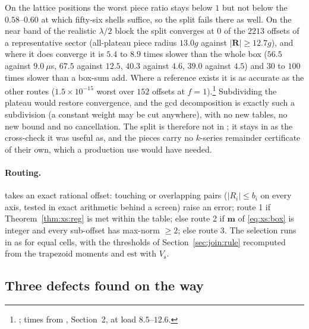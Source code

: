 \noindent
On the lattice positions the worst piece ratio stays below $1$ but not below the
$0.58$--$0.60$ at which fifty-six shells suffice, so the split fails there as well. On the
near band of the realistic $\lambda/2$ block the split converges at $0$ of the
$2213$ offsets of a representative sector (all-plateau piece radius $13.0g$ against
$|\mathbf{R}|\ge12.7g$), and where it does converge it is $5.4$ to $8.9$ times slower than
the whole box ($56.5$ against $9.0~\mu$s, $67.5$ against $12.5$, $40.3$ against $4.6$,
$39.0$ against $4.5$) and $30$ to $100$ times slower than a box-sum add. Where a reference
exists it is as accurate as the other routes ($1.5\times10^{-15}$ worst over $152$
offsets at $f = 1$).\footnote{; times from
, Section~2, at load $8.5$--$12.6$.} Subdividing the plateau would restore
convergence, and the gcd decomposition is exactly such a subdivision (a constant weight may
be cut anywhere), with no new tables, no new bound and no cancellation. The split is
therefore not in ; it stays in  as
the cross-check it was useful as, and the pieces carry no $k$-series remainder certificate
of their own, which a production use would have needed.

\paragraph{Routing.}  takes an exact rational offset: touching or
overlapping pairs ($|R_i|\le b_i$ on every axis, tested in exact arithmetic behind a
 screen) raise an error; route 1 if Theorem~\ref{thm:xs:reg} is met within
the table; else route 2 if $\mathbf{m}$ of \eqref{eq:xs:box} is integer and every
sub-offset has max-norm $\ge2$; else route 3. The selection runs in  as for
equal cells, with the thresholds of Section~\ref{sec:join:rule} recomputed from the
trapezoid moments and $\mathrm{est}$ with $V_{\mathrm{s}}$.

\subsection{Three defects found on the way}
\label{sec:xs:def}

